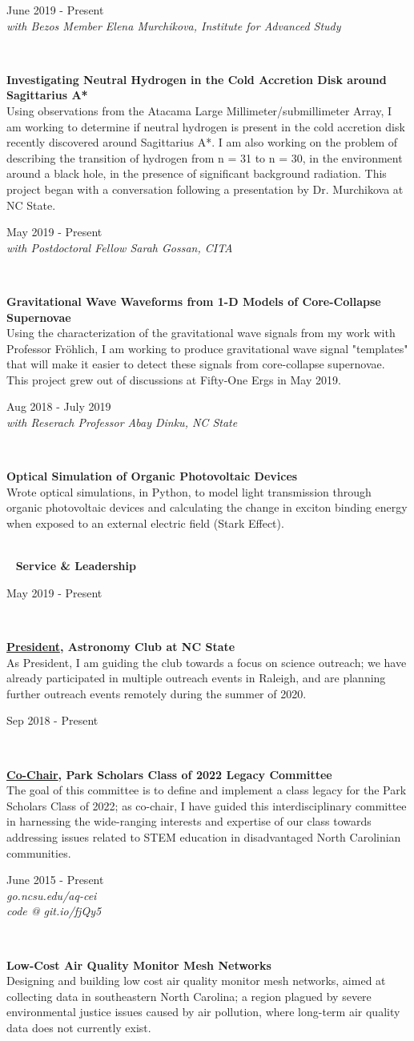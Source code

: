 \documentclass[8pt]{article}
\def \primarycolor   {spacecadet}
\def \tertiarycolor  {airforceblue} %
\def \titlerectmin{0.15cm}
\def \titlerectmax{0.35cm}
\def \leftcolwidth{3.05cm}
\newcommand{\cvheader}[1]{
    \tikz{\fill [\primarycolor] (0,\titlerectmin) rectangle (\leftcolwidth,\titlerectmax);} \ 
    \textcolor{\primarycolor}{ \large{\textbf{#1}} } 
}
\newcommand{\cventry}[4]{
    \begin{minipage}[t]{\leftcolwidth} 
        \small{
            \begin{flushright}
                #2\\
                \textcolor{\tertiarycolor}{\textit{#4}}
            \end{flushright}
        }
    \end{minipage} \ \
    \begin{minipage}[t]{\linewidth-\leftcolwidth} \normalsize{\textbf{#1} \\ #3} \end{minipage}
} %
\begin{document}
\cventry{Investigating Neutral Hydrogen in the Cold Accretion Disk around Sagittarius A*}{June 2019 - Present}
{Using observations from the Atacama Large Millimeter/submillimeter Array, I am working to determine if neutral hydrogen is present in the cold accretion disk recently discovered around Sagittarius A*. I am also working on the problem of describing the transition of hydrogen from n = 31 to n = 30, in the environment around a black hole, in the presence of significant background radiation. This project began with a conversation following a presentation by Dr. Murchikova at NC State.
}{with Bezos Member Elena Murchikova, Institute for Advanced Study}

\cventry{Gravitational Wave Waveforms from 1-D Models of Core-Collapse Supernovae}{May 2019 - Present}
{Using the characterization of the gravitational wave signals from my work with Professor Fr\"ohlich, I am working to produce gravitational wave signal "templates" that will make it easier to detect these signals from core-collapse supernovae. This project grew out of discussions at Fifty-One Ergs in May 2019.}{with Postdoctoral Fellow Sarah Gossan, CITA}

\cventry{Optical Simulation of Organic Photovoltaic Devices}{Aug 2018 - July 2019}{
Wrote optical simulations, in Python, to model light transmission through organic photovoltaic devices and calculating the change in exciton binding energy when exposed to an external electric field (Stark Effect).
}{with Reserach Professor Abay Dinku, NC State}
\\
\cvheader{Service \& Leadership}

\cventry{\underline{President}, Astronomy Club at NC State}{May 2019 - Present}{As President, I am guiding the club towards a focus on science outreach; we have already participated in multiple outreach events in Raleigh, and are planning further outreach events remotely during the summer of 2020.}{}

\cventry{\underline{Co-Chair}, Park Scholars Class of 2022 Legacy Committee}{Sep 2018 - Present}{The goal of this committee is to define and implement a class legacy for the Park Scholars Class of 2022; as co-chair, I have guided this interdisciplinary committee in harnessing the wide-ranging interests and expertise of our class towards addressing issues related to STEM education in disadvantaged North Carolinian communities.}{}

\cventry{Low-Cost Air Quality Monitor Mesh Networks}{June 2015 - Present}{Designing and building low cost air quality monitor mesh networks, aimed at collecting data in southeastern North Carolina; a region plagued by severe environmental justice issues caused by air pollution, where long-term air quality data does not currently exist.
}{go.ncsu.edu/aq-cei \\ code @ git.io/fjQy5}
\end{document}

